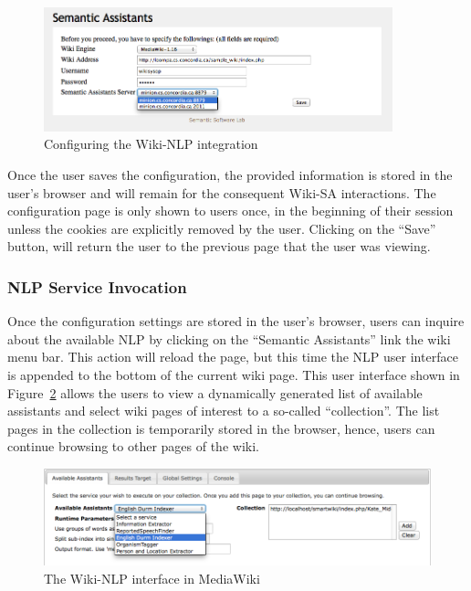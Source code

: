 \begin{figure}[ht]
\centering
\includegraphics[width=0.9\textwidth]{pictures/wiki_config.png}
\caption{Configuring the Wiki-NLP integration}
\label{fig:wiki_config}
\end{figure}

Once the user saves the configuration, the provided information is stored in the user's browser and will remain for the consequent Wiki-SA interactions. The configuration page is only shown to users once, in the beginning of their session unless the cookies are explicitly removed by the user. Clicking on the ``Save'' button, will return the user to the previous page that the user was viewing.

\subsubsection{NLP Service Invocation}
Once the configuration settings are stored in the user's browser, users can inquire about the available NLP by clicking on the ``Semantic Assistants'' link the wiki menu bar. This action will reload the page, but this time the NLP user interface is appended to the bottom of the current wiki page. This user interface shown in Figure~\ref{fig:semassist_ui} allows the users to view a dynamically generated list of available assistants and select wiki pages of interest to a so-called ``collection''. The list pages in the collection is temporarily stored in the browser, hence, users can continue browsing to other pages of the wiki.

\begin{figure}
\centering
\includegraphics[width=\textwidth]{pictures/semassist_ui.png}
\caption{The Wiki-NLP interface in MediaWiki}
\label{fig:semassist_ui}
\end{figure}

